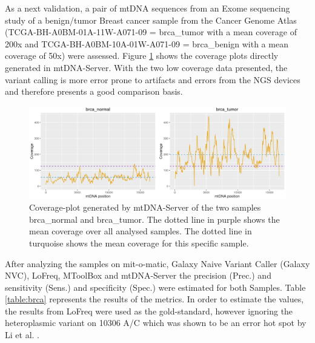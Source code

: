 As a next validation, a pair of mtDNA sequences from an Exome sequencing study of a benign/tumor Breast cancer sample from  the Cancer Genome Atlas \cite{Chang2013} (TCGA-BH-A0BM-01A-11W-A071-09 = brca\_tumor with a mean coverage of 200x and TCGA-BH-A0BM-10A-01W-A071-09 = brca\_benign with a mean coverage of 50x) were assessed. Figure \ref{fig:coverage_brca} shows the coverage plots directly generated in mtDNA-Server. With the two low coverage data presented, the variant calling is more error prone to artifacts and errors from the NGS devices and therefore presents a good comparison basis. 
\begin{figure}[!ht]
    \centering
    \includegraphics[width=1\textwidth]{images/coverage-brca.png}
    \caption[Coverage-plot generated by mtDNA-Server ]{Coverage-plot generated by mtDNA-Server of the two samples brca\_normal and brca\_tumor. The dotted line in purple shows the mean coverage over all analysed samples. The dotted line in turquoise shows the mean coverage for this specific sample.}
    \label{fig:coverage_brca}
\end{figure}
After analyzing the samples on mit-o-matic, Galaxy Naive Variant Caller (Galaxy NVC), LoFreq, MToolBox and mtDNA-Server the precision (Prec.) and sensitivity (Sens.) and specificity (Spec.) were estimated for both Samples. Table \ref{table:brca} represents the results of the metrics. In order to estimate the values, the results from LoFreq were used as the gold-standard, however ignoring the heteroplasmic variant on 10306 A/C which was shown to be an error hot spot by Li et al. \cite{Li2010}. 

